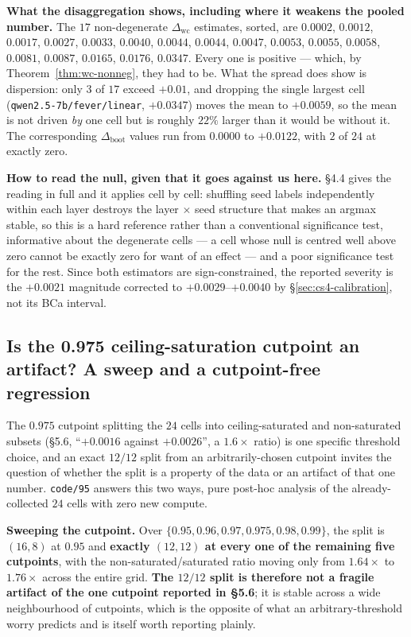 \documentclass[10pt]{article} %
\begin{document}
\textbf{What the disaggregation shows, including where it weakens the pooled
number.} The $17$ non-degenerate $\Delta_{\text{wc}}$ estimates, sorted, are
$0.0002$, $0.0012$, $0.0017$, $0.0027$, $0.0033$, $0.0040$, $0.0044$,
$0.0044$, $0.0047$, $0.0053$, $0.0055$, $0.0058$, $0.0081$, $0.0087$,
$0.0165$, $0.0176$, $0.0347$. Every one is positive --- which, by
Theorem~\ref{thm:wc-nonneg}, they had to be. What the spread does show is
dispersion: only $3$ of $17$ exceed $+0.01$, and dropping the single largest
cell (\texttt{qwen2.5-7b/fever/linear}, $+0.0347$) moves the mean to $+0.0059$,
so the mean is not driven \emph{by} one cell but is roughly $22\%$ larger than
it would be without it. The corresponding $\Delta_{\text{boot}}$ values run
from $0.0000$ to $+0.0122$, with $2$ of $24$ at exactly zero.

\textbf{How to read the null, given that it goes against us here.} §4.4 gives
the reading in full and it applies cell by cell: shuffling seed labels
independently within each layer destroys the layer $\times$ seed structure that
makes an argmax stable, so this is a hard reference rather than a conventional
significance test, informative about the degenerate cells --- a cell whose null
is centred well above zero cannot be exactly zero for want of an effect --- and
a poor significance test for the rest. Since both estimators are
sign-constrained, the reported severity is the $+0.0021$ magnitude corrected to
$+0.0029$--$+0.0040$ by \S\ref{sec:cs4-calibration}, not its BCa interval.

\subsection{Is the 0.975 ceiling-saturation cutpoint an artifact? A sweep and a cutpoint-free regression}
\label{sec:cs4-cutpoint-sensitivity}

The $0.975$ cutpoint splitting the $24$ cells into ceiling-saturated and
non-saturated subsets (\S5.6, ``$+0.0016$ against $+0.0026$'', a $1.6\times$
ratio) is one specific threshold choice, and an exact $12/12$ split from an
arbitrarily-chosen cutpoint invites the question of whether the split is a
property of the data or an artifact of that one number. \texttt{code/95}
answers this two ways, pure post-hoc analysis of the already-collected $24$
cells with zero new compute.

\textbf{Sweeping the cutpoint.} Over $\{0.95,0.96,0.97,0.975,0.98,0.99\}$, the
split is $(16,8)$ at $0.95$ and \textbf{exactly $(12,12)$ at every one of the
remaining five cutpoints}, with the non-saturated/saturated ratio moving only
from $1.64\times$ to $1.76\times$ across the entire grid. \textbf{The $12/12$
split is therefore not a fragile artifact of the one cutpoint reported in
\S5.6}; it is stable across a wide neighbourhood of cutpoints, which is the
opposite of what an arbitrary-threshold worry predicts and is itself worth
reporting plainly.
\end{document}
